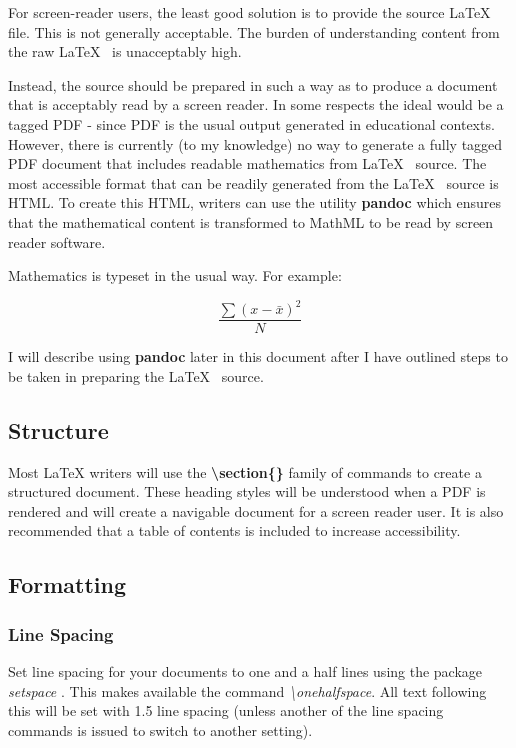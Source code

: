 \documentclass[]{article}
\begin{document}
For screen-reader users, the least good solution is to provide the source
\LaTeX~ file. This is not generally acceptable. The burden of
understanding content from the raw \LaTeX~ is unacceptably high.

Instead, the source should be prepared in such a way as to produce a
document that is acceptably read by a screen reader. In some respects
the ideal would be a tagged PDF - since PDF is the usual output
generated in educational contexts. However, there is currently (to my
knowledge) no way to generate a fully tagged PDF document that includes
readable mathematics from \LaTeX~ source. The most accessible format
that can be readily generated from the \LaTeX~ source is HTML.  To create this HTML, 
writers can use the utility \textbf{pandoc} \citep{pandoc} which ensures that the mathematical content is
transformed to MathML to be read by screen reader software. 

Mathematics is typeset in the usual way. For example:

\[\frac{\sum{(x-\bar{x})^2}}{N}\]

I will describe using \textbf{pandoc} later in this document after I
have outlined steps to be taken in preparing the \LaTeX~ source.

\hypertarget{structure}{%
\subsection{Structure}\label{structure}}

Most LaTeX writers will use the \textbf{\textbackslash{}section\{\}}
family of commands to create a structured document. These heading styles
will be understood when a PDF is rendered and will create a navigable
document for a screen reader user. It is also recommended that a table
of contents is included to increase accessibility.

\hypertarget{formatting}{%
\subsection{Formatting}\label{formatting}}

\hypertarget{linespacing}{%
\subsubsection{Line Spacing}\label{linespacing}}

Set line spacing for your documents to one and a half lines using the package \emph{setspace} \citep{setspace}.  This makes available the command
\emph{\textbackslash onehalfspace}.  All text following this will be set with 1.5 line spacing (unless another
of the line spacing commands is issued to switch to another setting).
\end{document}
